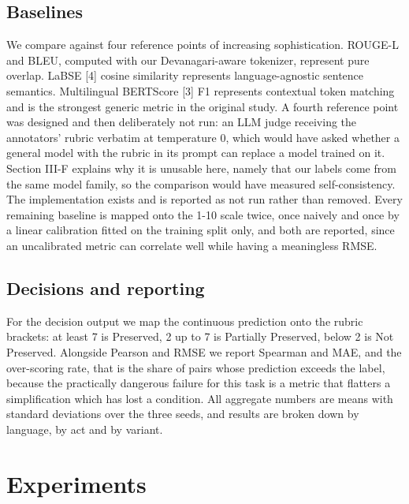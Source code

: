 \documentclass[conference]{IEEEtran}
\begin{document}
\subsection{Baselines}

We compare against four reference points of increasing sophistication. ROUGE-L and BLEU, computed with our Devanagari-aware tokenizer, represent pure overlap. LaBSE [4] cosine similarity represents language-agnostic sentence semantics. Multilingual BERTScore [3] F1 represents contextual token matching and is the strongest generic metric in the original study. A fourth reference point was designed and then deliberately not run: an LLM judge receiving the annotators' rubric verbatim at temperature 0, which would have asked whether a general model with the rubric in its prompt can replace a model trained on it. Section III-F explains why it is unusable here, namely that our labels come from the same model family, so the comparison would have measured self-consistency. The implementation exists and is reported as not run rather than removed. Every remaining baseline is mapped onto the 1-10 scale twice, once naively and once by a linear calibration fitted on the training split only, and both are reported, since an uncalibrated metric can correlate well while having a meaningless RMSE.

\subsection{Decisions and reporting}

For the decision output we map the continuous prediction onto the rubric brackets: at least 7 is Preserved, 2 up to 7 is Partially Preserved, below 2 is Not Preserved. Alongside Pearson and RMSE we report Spearman and MAE, and the over-scoring rate, that is the share of pairs whose prediction exceeds the label, because the practically dangerous failure for this task is a metric that flatters a simplification which has lost a condition. All aggregate numbers are means with standard deviations over the three seeds, and results are broken down by language, by act and by variant.

\section{Experiments}
\end{document}

